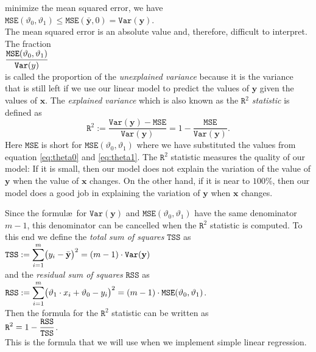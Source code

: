 minimize the mean squared error, we have
\\[0.2cm]
\hspace*{1.3cm}
$\mathtt{MSE}(\vartheta_0, \vartheta_1) \leq \mathtt{MSE}(\bar{\mathbf{y}}, 0) = \mathtt{Var}(\mathbf{y})$.
\\[0.2cm]
The mean squared error is an absolute value and, therefore, difficult to interpret.  The fraction
\\[0.2cm]
\hspace*{1.3cm}
$\displaystyle \frac{\mathtt{MSE}(\vartheta_0, \vartheta_1)}{\mathtt{Var}(y)}$
\\[0.2cm]
is called the proportion of the \emph{\color{blue}unexplained variance} because it is the variance that is still
left if we use our linear model to predict the values of $\mathbf{y}$ given the values of $\mathbf{x}$.  The
\emph{\color{blue}explained variance} which is also known as the \emph{\color{blue}$\mathtt{R}^2$ statistic} is defined as 
\begin{equation}
  \label{eq:Rsquare}
  \mathtt{R}^2 := \frac{\mathtt{Var}(\mathbf{y}) - \mathtt{MSE}}{\mathtt{Var}(\mathbf{y})} = 1 - \frac{\mathtt{MSE}}{\mathtt{Var}(\mathbf{y})}.
\end{equation}
Here $\mathtt{MSE}$ is short for $\mathtt{MSE}(\vartheta_0, \vartheta_1)$ where we have substituted the values
from equation \ref{eq:theta0} and \ref{eq:theta1}.  The $\mathtt{R}^2$ statistic measures the quality of our
model: If it is small, then our model does not explain the variation of the value of $\mathbf{y}$ when the value of $\mathbf{x}$
changes.  On the other hand, if it is near to $100\%$, then our model does a good job in explaining the 
variation of $\mathbf{y}$ when $\mathbf{x}$ changes.

Since the formul\ae\ for $\mathtt{Var}(\mathbf{y})$ and $\mathtt{MSE}(\vartheta_0, \vartheta_1)$ have the same
denominator $m-1$, this denominator can be cancelled when the $\mathtt{R}^2$ statistic is computed.  To this
end we define the \emph{\color{blue}total sum of squares} $\mathtt{TSS}$ as
\\[0.2cm]
\hspace*{1.3cm}
$\displaystyle\mathtt{TSS} := \sum\limits_{i=1}^m \bigl(y_i - \bar{\mathbf{y}}\bigr)^2 = (m-1) \cdot \mathtt{Var}(\mathbf{y})$
\\[0.2cm]
and the \emph{\color{blue}residual sum of squares} $\mathtt{RSS}$ as
\\[0.2cm]
\hspace*{1.3cm}
$\displaystyle\mathtt{RSS} := \sum\limits_{i=1}^m \bigl(\vartheta_1 \cdot x_i + \vartheta_0 - y_i\bigr)^2
                  = (m-1) \cdot \mathtt{MSE}(\vartheta_0, \vartheta_1)
$.
\\[0.2cm]
Then the formula for the $\mathtt{R}^2$ statistic can be written as
\\[0.2cm]
\hspace*{1.3cm}
$\displaystyle \mathtt{R}^2 = 1 - \frac{\mathtt{RSS}}{\mathtt{TSS}}$.
\\[0.2cm]
This is the formula that we will use when we implement simple linear regression.

